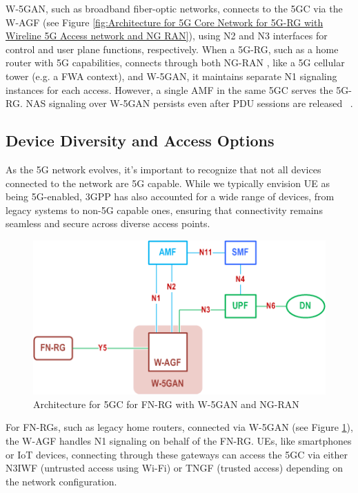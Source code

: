 \ac{W-5GAN}, such as broadband fiber-optic networks, connects to the \ac{5GC} via the \ac{W-AGF} (see Figure \ref{fig:Architecture for 5G Core Network for 5G-RG with Wireline 5G Access network and NG RAN}), using N2 and N3 interfaces for control and user plane functions, respectively. When a \acf{5G-RG}, such as a home router with \ac{5G} capabilities, connects through both \ac{NG-RAN} , like a \ac{5G} cellular tower (e.g. a \ac{FWA} context), and \ac{W-5GAN}, it maintains separate N1 signaling instances for each access. However, a single \ac{AMF} in the same \ac{5GC} serves the \ac{5G-RG}. \ac{NAS} signaling over \ac{W-5GAN} persists even after \acf{PDU} sessions are released ~\cite{23.501-p66}.

\subsection{Device Diversity and Access Options}

As the \ac{5G} network evolves, it's important to recognize that not all devices connected to the network are \ac{5G} capable. While we typically envision \ac{UE} as being \ac{5G}-enabled, \ac{3GPP} has also accounted for a wide range of devices, from legacy systems to non-\ac{5G} capable ones, ensuring that connectivity remains seamless and secure across diverse access points.

\begin{figure}
    \centering
    \includegraphics[width=0.5\linewidth]{figs/Architecture for 5G Core Network for FN-RG with Wireline 5G Access network and NG RAN.png}
    \caption{Architecture for \acl{5GC} for \acs{FN-RG} with \ac{W-5GAN} and \ac{NG-RAN}}
    \label{fig:Architecture for 5G Core Network for FN-RG with Wireline 5G Access network and NG RAN}
\end{figure}

For \acp{FN-RG}, such as legacy home routers, connected via \ac{W-5GAN} (see Figure \ref{fig:Architecture for 5G Core Network for FN-RG with Wireline 5G Access network and NG RAN}), the \ac{W-AGF} handles N1 signaling on behalf of the \ac{FN-RG}. \acp{UE}, like smartphones or \ac{IoT} devices, connecting through these gateways can access the \ac{5GC} via either \ac{N3IWF} (untrusted access using Wi-Fi) or \ac{TNGF} (trusted access) depending on the network configuration.

